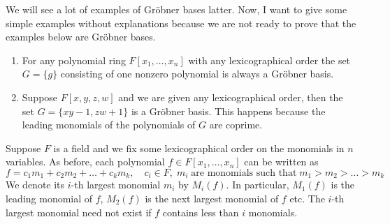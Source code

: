 \begin{examples}
We will see a lot of examples of Gr\"obner bases latter.
Now, I want to give some simple examples without explanations because we are not ready to prove that the examples below are Gr\"obner bases.
\begin{enumerate}
\item For any polynomial ring $F[x_1,\ldots,x_n]$ with any lexicographical order the set $G = \{g\}$ consisting of one nonzero polynomial is always a Gr\"obner basis.

\item Suppose $F[x,y,z,w]$ and we are given any lexicographical order, then the set $G = \{xy - 1, zw + 1\}$ is a Gr\"obner basis.
This happens because the leading monomials of the polynomials of $G$ are coprime.
\end{enumerate}
\end{examples}


\begin{definition}
Suppose $F$ is a field and we fix some lexicographical order on the monomials in $n$ variables.
As before, each polynomial $f\in F[x_1,\ldots,x_n]$ can be written as
\[
f = c_1 m_1 + c_2 m_2 + \ldots + c_k m_k,\quad c_i\in F,\;m_i\;\text{are monomials such that}\; m_1 > m_2 >\ldots>m_k
\]
We denote its $i$-th largest monomial $m_i$ by $M_i(f)$.
In particular, $M_1(f)$ is the leading monomial of $f$, $M_2(f)$ is the next largest monomial of $f$ etc.
The $i$-th largest monomial need not exist if $f$ contains less than $i$ monomials.
\end{definition}



